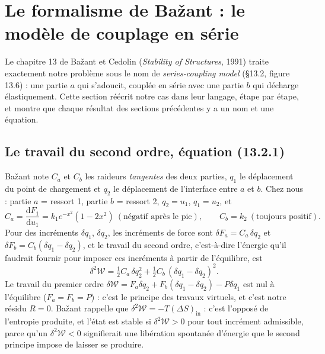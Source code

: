 \documentclass[11pt,a4paper]{article}
\newcommand{\dd}{\mathrm{d}}
\begin{document}
\section{Le formalisme de Bažant : le modèle de couplage en série}
\label{sec:bazant}
Le chapitre 13 de Bažant et Cedolin (\emph{Stability of Structures}, 1991) traite exactement
notre problème sous le nom de \emph{series-coupling model} (§13.2, figure 13.6) : une partie
$a$ qui s'adoucit, couplée en série avec une partie $b$ qui décharge élastiquement. Cette
section réécrit notre cas dans leur langage, étape par étape, et montre que chaque résultat
des sections précédentes y a un nom et une équation.

\subsection{Le travail du second ordre, équation (13.2.1)}
Bažant note $C_a$ et $C_b$ les raideurs \emph{tangentes} des deux parties, $q_1$ le
déplacement du point de chargement et $q_2$ le déplacement de l'interface entre $a$ et $b$.
Chez nous : partie $a$ = ressort 1, partie $b$ = ressort 2, $q_2 = u_1$, $q_1 = u_2$, et
\begin{equation}
  C_a = \frac{\dd F_1}{\dd u_1} = k_1e^{-x^2}(1-2x^2)\ (\text{négatif après le pic}),\qquad
  C_b = k_2\ (\text{toujours positif}).
\end{equation}
Pour des incréments $\delta q_1$, $\delta q_2$, les incréments de force sont
$\delta F_a = C_a\,\delta q_2$ et $\delta F_b = C_b(\delta q_1-\delta q_2)$, et le travail du
second ordre, c'est-à-dire l'énergie qu'il faudrait fournir pour imposer ces incréments à
partir de l'équilibre, est
\begin{equation}
  \delta^2\mathcal W = \tfrac12C_a\,\delta q_2^2 + \tfrac12C_b\,(\delta q_1-\delta q_2)^2 .
  \tag{13.2.1}
\end{equation}
Le travail du premier ordre $\delta\mathcal W = F_a\delta q_2 + F_b(\delta q_1-\delta q_2) - P\delta q_1$
est nul à l'équilibre ($F_a = F_b = P$) : c'est le principe des travaux virtuels, et c'est
notre résidu $R = 0$. Bažant rappelle que $\delta^2\mathcal W = -T(\Delta S)_{\text{in}}$ : c'est
l'opposé de l'entropie produite, et l'état est stable si $\delta^2\mathcal W > 0$ pour tout
incrément admissible, parce qu'un $\delta^2\mathcal W < 0$ signifierait une libération spontanée
d'énergie que le second principe impose de laisser se produire.
\end{document}
